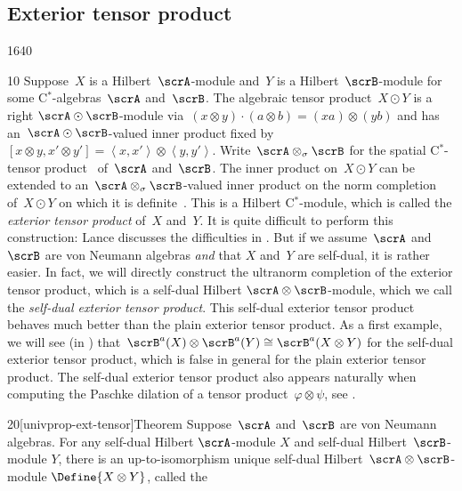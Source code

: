 \subsection{Exterior tensor product}
\begin{parsec}{1640}%
\begin{point}{10}%
Suppose~$X$ is a Hilbert~$\scrA$-module
    and~$Y$ is a Hilbert~$\scrB$-module
    for some C$^*$-algebras~$\scrA$ and~$\scrB$.
The algebraic tensor product~$X \odot Y$
    is a right $\scrA \odot \scrB$-module
    via~$(x\otimes y)\cdot (a\otimes b) = (xa) \otimes (yb)$
    and has an~$\scrA \odot \scrB$-valued inner
    product fixed by~$[x\otimes y, x'\otimes y']
        = \left<x,x'\right> \otimes \left<y,y'\right>$.
Write~$\scrA \otimes_\sigma \scrB$ for the spatial
    C$^*$-tensor product~\cite[\S11.3]{kr} of~$\scrA$ and~$\scrB$.
The inner product on~$X \odot Y$ can be extended
    to an~$\scrA \otimes_\sigma \scrB$-valued inner product
    on the norm completion of~$X \odot Y$
    on which it is definite~\cite{lance}.
This is a Hilbert C$^*$-module,
    which is called the \emph{exterior tensor product} of~$X$ and~$Y$.
It is quite difficult to perform this construction:
    Lance discusses the difficulties in \cite[ch.~4]{lance}.
But if we assume~$\scrA$ and~$\scrB$ are von Neumann algebras
    \emph{and} that $X$ and~$Y$ are self-dual,
    it is rather easier.
In fact, we will directly construct the ultranorm completion
    of the exterior tensor product,
    which is a self-dual Hilbert $\scrA \otimes \scrB$-module,
    which we call the \emph{self-dual exterior tensor product}.
This self-dual exterior tensor product
    behaves much better than the plain exterior tensor product.
    As a first example, we will see (in )
    that~$\scrB^a(X) \otimes \scrB^a(Y) \cong \scrB^a(X\otimes Y)$
        for the self-dual exterior tensor product,
        which is false in general for the plain exterior tensor product.
The self-dual exterior tensor product also appears naturally
    when computing the Paschke dilation
    of a tensor product~$\varphi \otimes \psi$, see .
\end{point}
\begin{point}{20}[univprop-ext-tensor]{Theorem}%
Suppose~$\scrA$ and~$\scrB$ are von Neumann algebras.
For any self-dual Hilbert $\scrA$-module $X$
    and self-dual Hilbert~$\scrB$-module $Y$,
    there is an up-to-isomorphism unique
    self-dual Hilbert~$\scrA\otimes \scrB$-module
    $\Define{X \otimes Y}$, called the %

\end{point}
\end{parsec}
